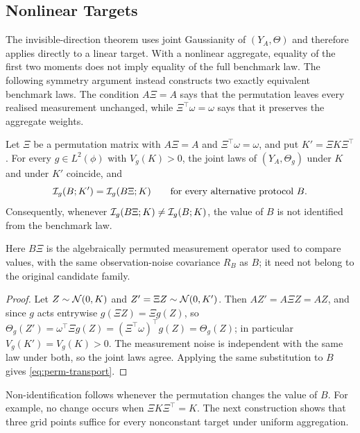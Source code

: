 \subsection{Nonlinear Targets}

The invisible-direction theorem uses joint Gaussianity of
$(Y_A,\Theta)$ and therefore applies directly to a linear target. With a
nonlinear aggregate, equality of the first two moments does not imply equality
of the full benchmark law. The following symmetry argument instead constructs
two exactly equivalent benchmark laws. The condition $A\Xi=A$ says that the
permutation leaves every realised measurement unchanged, while
$\Xi^\top\omega=\omega$ says that it preserves the aggregate weights.

\begin{proposition}
\label{prop:permutation}
Let $\Xi$ be a permutation matrix with $A\Xi=A$ and $\Xi^\top\omega=\omega$, and put
$K'=\Xi K\Xi^\top$. For every $g\in L^2(\phi)$ with $V_g(K)>0$, the joint laws of
$(Y_A,\Theta_g)$ under $K$ and under $K'$ coincide, and
\begin{equation}
\mathcal{I}_g(B;K')=\mathcal{I}_g(B\Xi;K)
\qquad\text{for every alternative protocol }B .
\label{eq:perm-transport}
\end{equation}
Consequently, whenever $\mathcal{I}_g(B\Xi;K)\neq\mathcal{I}_g(B;K)$, the value of $B$ is not
identified from the benchmark law.
\end{proposition}

Here $B\Xi$ is the algebraically permuted measurement operator used to compare
values, with the same observation-noise covariance $R_B$ as $B$; it need not
belong to the original candidate family.

\begin{proof}
Let $Z\sim\mathcal{N}(0,K)$ and $Z'=\Xi Z\sim\mathcal{N}(0,K')$. Then $AZ'=A\Xi Z=AZ$, and since
$g$ acts entrywise $g(\Xi Z)=\Xi g(Z)$, so
$\Theta_g(Z')=\omega^\top\Xi g(Z)=(\Xi^\top\omega)^\top g(Z)=\Theta_g(Z)$; in
particular $V_g(K')=V_g(K)>0$. The measurement noise is independent with the
same law under both, so the joint laws agree. Applying the same substitution to
$B$ gives \eqref{eq:perm-transport}.
\end{proof}

Non-identification follows whenever the permutation changes the value of $B$.
For example, no change occurs when $\Xi K\Xi^\top=K$. The next construction
shows that three grid points suffice for every nonconstant target under uniform
aggregation.

